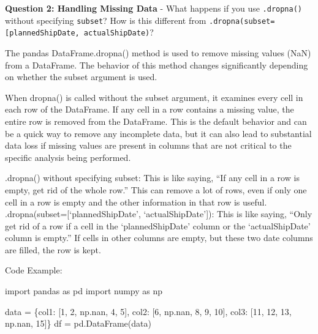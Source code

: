 \documentclass[
  letterpaper,
  DIV=11,
  numbers=noendperiod]{scrartcl}
\newenvironment{Shaded}{\begin{snugshade}}{\end{snugshade}}
\newcommand{\DecValTok}[1]{\textcolor[rgb]{0.68,0.00,0.00}{#1}}
\newcommand{\ImportTok}[1]{\textcolor[rgb]{0.00,0.46,0.62}{#1}}
\newcommand{\NormalTok}[1]{\textcolor[rgb]{0.00,0.23,0.31}{#1}}
\newcommand{\OperatorTok}[1]{\textcolor[rgb]{0.37,0.37,0.37}{#1}}
\newcommand{\StringTok}[1]{\textcolor[rgb]{0.13,0.47,0.30}{#1}}
\begin{document}
\begin{tcolorbox}
\textbf{Question 2: Handling Missing Data} - What happens if you use
\texttt{.dropna()} without specifying \texttt{subset}? How is this
different from
\texttt{.dropna(subset={[}\textquotesingle{}plannedShipDate\textquotesingle{},\ \textquotesingle{}actualShipDate\textquotesingle{}{]})}?

The pandas DataFrame.dropna() method is used to remove missing values
(NaN) from a DataFrame. The behavior of this method changes
significantly depending on whether the subset argument is used.

When dropna() is called without the subset argument, it examines every
cell in each row of the DataFrame. If any cell in a row contains a
missing value, the entire row is removed from the DataFrame. This is the
default behavior and can be a quick way to remove any incomplete data,
but it can also lead to substantial data loss if missing values are
present in columns that are not critical to the specific analysis being
performed.

.dropna() without specifying subset: This is like saying, ``If any cell
in a row is empty, get rid of the whole row.'' This can remove a lot of
rows, even if only one cell in a row is empty and the other information
in that row is useful. .dropna(subset={[}`plannedShipDate',
`actualShipDate'{]}): This is like saying, ``Only get rid of a row if a
cell in the `plannedShipDate' column or the `actualShipDate' column is
empty.'' If cells in other columns are empty, but these two date columns
are filled, the row is kept.

Code Example:

\begin{Shaded}
\begin{Highlighting}[]
\ImportTok{import}\NormalTok{ pandas }\ImportTok{as}\NormalTok{ pd}
\ImportTok{import}\NormalTok{ numpy }\ImportTok{as}\NormalTok{ np}

\NormalTok{data }\OperatorTok{=}\NormalTok{ \{}\StringTok{\textquotesingle{}col1\textquotesingle{}}\NormalTok{: [}\DecValTok{1}\NormalTok{, }\DecValTok{2}\NormalTok{, np.nan, }\DecValTok{4}\NormalTok{, }\DecValTok{5}\NormalTok{],}
        \StringTok{\textquotesingle{}col2\textquotesingle{}}\NormalTok{: [}\DecValTok{6}\NormalTok{, np.nan, }\DecValTok{8}\NormalTok{, }\DecValTok{9}\NormalTok{, }\DecValTok{10}\NormalTok{],}
        \StringTok{\textquotesingle{}col3\textquotesingle{}}\NormalTok{: [}\DecValTok{11}\NormalTok{, }\DecValTok{12}\NormalTok{, }\DecValTok{13}\NormalTok{, np.nan, }\DecValTok{15}\NormalTok{]\}}
\NormalTok{df }\OperatorTok{=}\NormalTok{ pd.DataFrame(data)}


\end{Highlighting}
\end{Shaded}
\end{tcolorbox}
\end{document}
